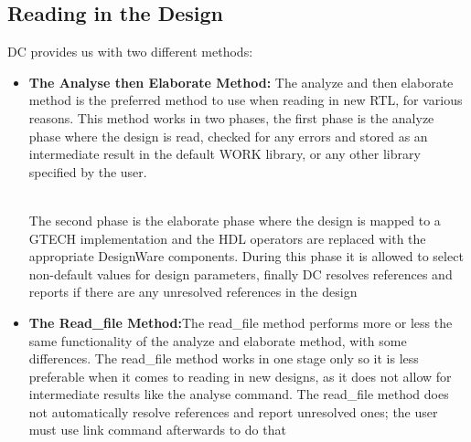 \documentclass[../main.tex]{subfiles}
\begin{document}
	
    \subsection{Reading in the Design}
    DC provides us with two different methods:
    
\begin{itemize}
\item \textbf{The Analyse then Elaborate Method:} The analyze and then elaborate method is the preferred method to use when reading in new RTL, for various reasons. This method works in two phases, the first phase is the analyze phase where the design is read, checked for any errors and stored as an intermediate result in the default WORK library, or any other library specified by the user.

\\The second phase is the elaborate phase where the design is mapped to a GTECH 
implementation and the HDL operators are replaced with the appropriate DesignWare 
components. During this phase it is allowed to select non-default values for design 
parameters, finally DC resolves references and reports if there are any unresolved 
references in the design
\item \textbf{The Read\_file Method:}The read\_file method performs more or less the same functionality of the analyze
and elaborate method, with some differences. The read\_file method works in one stage only so it is less preferable when it comes to reading in new designs, as it does not allow for intermediate results like the analyse command. The read\_file method does not automatically resolve references and report unresolved ones; the user must use link command afterwards to do that
\end{itemize}
\begin{itemize}
\end{itemize}
\begin{itemize}
\end{itemize}
\begin{itemize}
\end{itemize}
\end{document}
